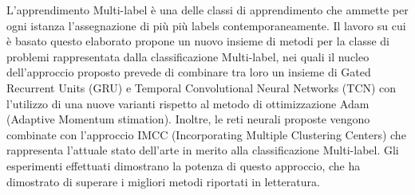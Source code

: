 L'apprendimento Multi-label è una delle classi di apprendimento che ammette per ogni istanza l'assegnazione di più più labels contemporaneamente. Il lavoro su cui è basato questo elaborato propone un nuovo insieme di metodi per la classe di problemi rappresentata dalla classificazione Multi-label, nei quali il nucleo dell'approccio proposto prevede di combinare tra loro un insieme di Gated Recurrent Units (GRU) e Temporal Convolutional Neural Networks (TCN) con l'utilizzo di una nuove varianti rispetto al metodo di ottimizzazione Adam (Adaptive Momentum stimation). Inoltre, le reti neurali proposte vengono combinate con l'approccio IMCC (Incorporating Multiple Clustering Centers) che rappresenta l'attuale stato dell'arte in merito alla classificazione Multi-label. Gli esperimenti effettuati dimostrano la potenza di questo approccio, che ha dimostrato di superare i migliori metodi riportati in letteratura.